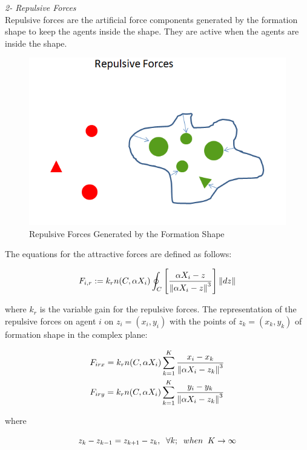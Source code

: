 \textit{	2- Repulsive Forces} \\ 
Repulsive forces are the artificial force components generated by the formation shape to keep the agents inside the shape. They are active when the agents are inside the shape. 
					
\begin{figure}[H]
\caption{Repulsive Forces Generated by the Formation Shape}
\centering
\includegraphics[scale = 0.60]{repulsive_forces}
\end{figure}
							
The equations for the attractive forces are defined as follows:	

\begin{equation}
F_{i,r} := k_r  n(C,\alpha X_i) \oint_C \left[\frac{\alpha X_i - z}{\left\lVert\alpha X_i - z\right\rVert^3}\right] \left\lVert dz\right\rVert
\end{equation}

where $k_r$ is the variable gain for the repulsive forces. The representation of the repulsive forces on agent $i$ on $z_i = (x_i, y_i)$ with the points of  $z_k = (x_k,y_k)$ of formation shape in the complex plane:

\begin{align*}
& F_{irx} = k_r n(C,\alpha X_i)  \sum_{k=1}^{K} \frac{x_i - x_k}{\left\lVert\alpha X_i - z_k\right\rVert^3}\\
& F_{iry} = k_r n(C,\alpha X_i)  \sum_{k=1}^{K} \frac{y_i - y_k}{\left\lVert\alpha X_i - z_k\right\rVert^3}
\end{align*}
				
where

\begin{equation}
z_k - z_{k-1} = z_{k+1} - z_k, \hspace{0.2cm}  \forall k ;  \hspace{0.2cm} when  \hspace{0.2cm} K \to\infty
\end{equation}
						
